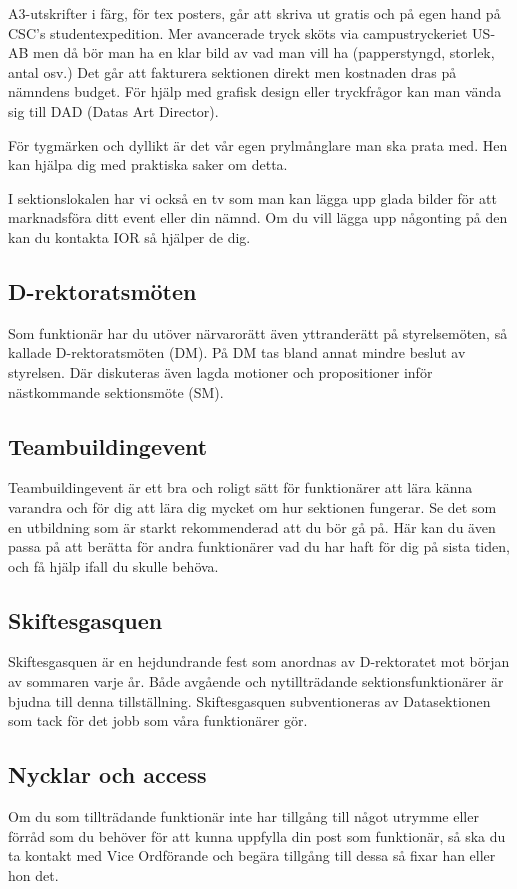 \documentclass[a4paper,11pt]{article}
\begin{document}
A3-utskrifter i färg, för tex posters, går att skriva ut gratis och på egen hand på CSC's studentexpedition. Mer avancerade tryck sköts via campustryckeriet US-AB men då bör man ha en klar bild av vad man vill ha (papperstyngd, storlek, antal osv.) Det går att fakturera sektionen direkt men kostnaden dras på nämndens budget.
För hjälp med grafisk design eller tryckfrågor kan man vända sig till DAD (Datas Art Director).

För tygmärken och dyllikt är det vår egen prylmånglare man ska prata med. Hen kan hjälpa dig med praktiska saker om detta.

I sektionslokalen har vi också en tv som man kan lägga upp glada bilder för att marknadsföra ditt event eller din nämnd. Om du vill lägga upp någonting på den kan du kontakta IOR så hjälper de dig.

\subsection{D-rektoratsmöten}
Som funktionär har du utöver närvarorätt även yttranderätt på styrelsemöten, så kallade D-rektoratsmöten (DM). På DM tas bland annat mindre beslut av styrelsen. Där diskuteras även lagda motioner och propositioner inför nästkommande sektionsmöte (SM).

\subsection{Teambuildingevent}
Teambuildingevent är ett bra och roligt sätt för funktionärer att lära känna varandra och för dig att lära dig mycket om hur sektionen fungerar. Se det som en utbildning som är starkt rekommenderad att du bör gå på. Här kan du även passa på att berätta för andra funktionärer vad du har haft för dig på sista tiden, och få hjälp ifall du skulle behöva.

\subsection{Skiftesgasquen}
Skiftesgasquen är en hejdundrande fest som anordnas av D-rektoratet mot början av sommaren varje år. Både avgående och nytillträdande sektionsfunktionärer är bjudna till denna tillställning. Skiftesgasquen subventioneras av Datasektionen som tack för det jobb som våra funktionärer gör.


\subsection{Nycklar och access}
Om du som tillträdande funktionär inte har tillgång till något utrymme eller förråd som du behöver för att kunna uppfylla din post som funktionär, så ska du ta kontakt med Vice Ordförande och begära tillgång till dessa så fixar han eller hon det.
\end{document}
